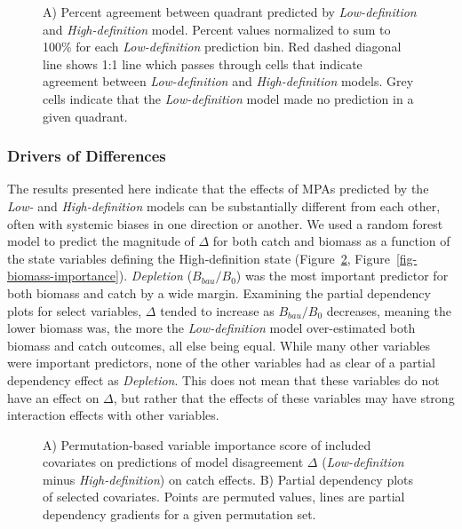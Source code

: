 \documentclass[
  default,
  lineno,
  referee]{sn-jnl}
\begin{document}
\begin{figure}


\caption{\label{fig-agreement}A) Percent agreement between quadrant
predicted by \emph{Low-definition} and \emph{High-definition} model.
Percent values normalized to sum to 100\% for each \emph{Low-definition}
prediction bin. Red dashed diagonal line shows 1:1 line which passes
through cells that indicate agreement between \emph{Low-definition} and
\emph{High-definition} models. Grey cells indicate that the
\emph{Low-definition} model made no prediction in a given quadrant.}

\end{figure}%

\subsubsection{Drivers of Differences}\label{drivers-of-differences}

The results presented here indicate that the effects of MPAs predicted
by the \emph{Low-} and \emph{High-definition} models can be
substantially different from each other, often with systemic biases in
one direction or another. We used a random forest model to predict the
magnitude of \(\Delta\) for both catch and biomass as a function of the
state variables defining the High-definition state
(Figure~\ref{fig-catch-importance},
Figure~\ref{fig-biomass-importance}). \emph{Depletion} (\(B_{bau}/B_0\))
was the most important predictor for both biomass and catch by a wide
margin. Examining the partial dependency plots for select variables,
\(\Delta\) tended to increase as \(B_{bau}/B_0\) decreases, meaning the
lower biomass was, the more the \emph{Low-definition} model
over-estimated both biomass and catch outcomes, all else being equal.
While many other variables were important predictors, none of the other
variables had as clear of a partial dependency effect as
\emph{Depletion}. This does not mean that these variables do not have an
effect on \(\Delta\), but rather that the effects of these variables may
have strong interaction effects with other variables.

\begin{figure}


\caption{\label{fig-catch-importance}A) Permutation-based variable
importance score of included covariates on predictions of model
disagreement \(\Delta\) (\emph{Low-definition} minus
\emph{High-definition}) on catch effects. B) Partial dependency plots of
selected covariates. Points are permuted values, lines are partial
dependency gradients for a given permutation set.}

\end{figure}%
\end{document}
